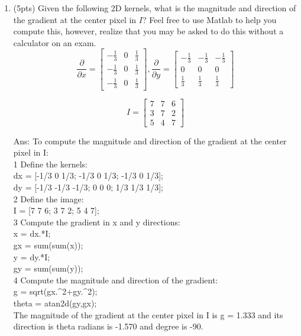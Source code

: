 \documentclass[12pt]{article}
\begin{document}
\begin{enumerate}
\item (5pts) Given the following 2D kernels, what is the magnitude and direction of the gradient at the center pixel in $I$?  Feel free to use Matlab to help you compute this, however, realize that you may be asked to do this without a calculator on an exam.
$$\frac{\partial}{\partial x} = \begin{bmatrix}
-\frac{1}{3}&0&\frac{1}{3}\\
-\frac{1}{3}&0&\frac{1}{3}\\
-\frac{1}{3}&0&\frac{1}{3}
\end{bmatrix}, 
\frac{\partial}{\partial y}=\begin{bmatrix}
-\frac{1}{3}&-\frac{1}{3}&-\frac{1}{3}\\
0&0&0\\
\frac{1}{3}&\frac{1}{3}&\frac{1}{3}
\end{bmatrix}$$

$$I= \begin{bmatrix}
7&7&6\\
3&7&2\\
5&4&7
\end{bmatrix}
$$

Ans:  To compute the magnitude and direction of the gradient at the center pixel in I: \\

1 Define the kernels:\\
dx = [-1/3 0 1/3; -1/3 0 1/3; -1/3 0 1/3];\\
dy = [-1/3 -1/3 -1/3; 0 0 0; 1/3 1/3 1/3];\\

2 Define the image:\\
I = [7 7 6; 3 7 2; 5 4 7];\\

3 Compute the gradient in x and y directions:\\
x = dx.*I;\\
gx = sum(sum(x));\\
y = dy.*I;\\
gy = sum(sum(y));\\

4 Compute the magnitude and direction of the gradient:\\
g = sqrt(gx.\^{}2+gy.\^{}2);\\
theta = atan2d(gy,gx); \\

The magnitude of the gradient at the center pixel in I is g = 1.333 and its direction is theta radians is -1.570 and degree is -90.




\end{enumerate}
\end{document}
